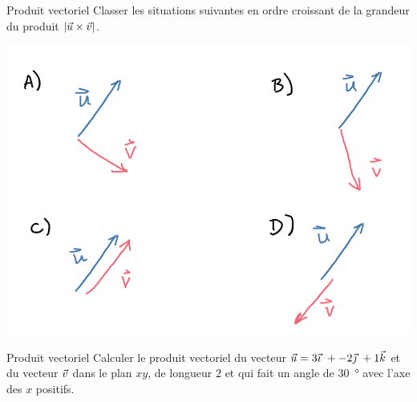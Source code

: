\documentclass{beamer}
\begin{document}
\begin{frame}{Produit vectoriel}
  Classer les situations suivantes en ordre croissant de la grandeur du produit
  $\left| \vec{u} \times \vec{v} \right|$.

  \begin{center}
    \includegraphics[scale=0.5]{figures/produit-vec_ex1.png}
  \end{center}
\end{frame}


\begin{frame}{Produit vectoriel}
  Calculer le produit vectoriel du vecteur $\vec{u} = 3 \vec{\imath}\ + -2 \vec{\jmath}\ + 1 \vec{k}$ et du
  vecteur $\vec{v}$ dans le plan $xy$, de longueur $2$ et qui fait un angle de
  \SI{30}{\degree} avec l'axe des $x$ positifs.
\end{frame}
\end{document}
